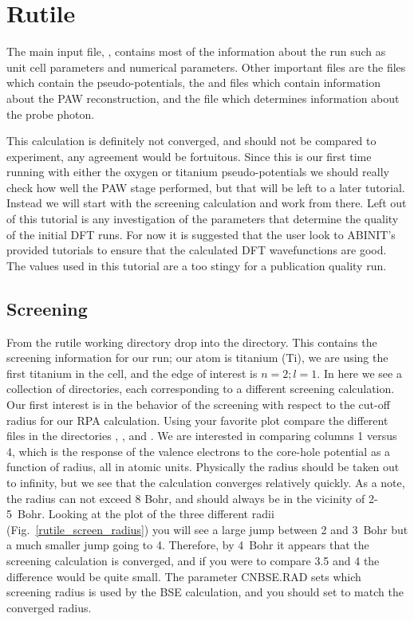 \documentclass[11pt]{report}
\begin{document}
\iffalse
\section{Rutile}

The main input file, , contains most of the information about the run such as unit cell parameters and numerical parameters. Other important files are the  files which contain the pseudo-potentials, the  and  files which contain information about the PAW reconstruction, and the  file which determines information about the probe photon. 

This calculation is definitely not converged, and should not be compared to experiment, any agreement would be fortuitous. Since this is our first time running with either the oxygen or titanium pseudo-potentials we should really check how well the PAW stage performed, but that will be left to a later tutorial. Instead we will start with the screening calculation and work from there. Left out of this tutorial is any investigation of the parameters that determine the quality of the initial DFT runs. For now it is suggested that the user look to ABINIT's provided tutorials to ensure that the calculated DFT wavefunctions are good. The values used in this tutorial are a too stingy for a publication quality run.

\subsection{Screening}



From the rutile working directory drop into the  directory. This contains the screening information for our run; our atom is titanium (Ti), we are using the first titanium in the cell, and the edge of interest is $n=2;l=1$. In here we see a collection of directories, each corresponding to a different screening calculation. Our first interest is in the behavior of the screening with respect to the cut-off radius for our RPA calculation. Using your favorite plot compare the different  files in the directories , , and . We are interested in comparing columns 1 versus 4, which is the response of the valence electrons to the core-hole potential as a function of radius, all in atomic units. Physically the radius should be taken out to infinity, but we see that the calculation converges relatively quickly. As a note, the radius can not exceed 8 Bohr, and should always be in the vicinity of 2-5~Bohr. Looking at the plot of the three different radii (Fig.\ \ref{rutile_screen_radius}) you will see a large jump between 2 and 3~Bohr but a much smaller jump going to 4. Therefore, by 4~Bohr it appears that the screening calculation is converged, and if you were to compare 3.5 and 4 the difference would be quite small. The parameter CNBSE.RAD sets which screening radius is used by the BSE calculation, and you should set to match the converged radius.
\end{document}
